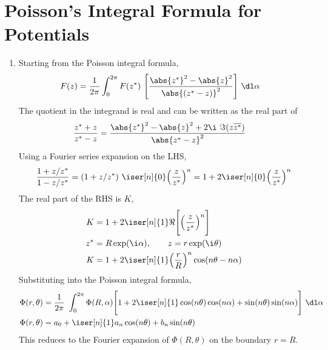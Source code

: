 \section{Poisson's Integral Formula for Potentials}

\begin{enumerate}
    \item Starting from the Poisson integral formula,
          \begin{align}
              F(z) & = \frac{1}{2\pi} \int_{0}^{2\pi} F(z^*)
              \ \Bigg[\frac{\abs{z^*}^2 - \abs{z}^2} {\abs{(z^* - z)}^2}\Bigg]
              \ \dl \alpha
          \end{align}
          The quotient in the integrand is real and can be written as the real part of
          \begin{align}
              \frac{z^* + z}{z^* - z} & = \frac{\abs{z^*}^2 - \abs{z}^2
                  + 2\i\ \Im(z \overline{z^*})}{\abs{z^* - z}^2}
          \end{align}
          Using a Fourier series expansion on the LHS,
          \begin{align}
              \frac{1 + z/z^*}{1 - z/z^*} = (1 + z/z^*)\ \iser[n]{0}
              \Big(\frac{z}{z^*}\Big)^n = 1 + 2\iser[n]{0} \Big(\frac{z}{z^*}
              \Big)^n
          \end{align}
          The real part of the RHS is $ K $,
          \begin{align}
              K   & = 1 + 2 \iser[n]{1} \Re{\Bigg[ \Big(\frac{z}{z^*} \Big)^n \Bigg]} \\
              z^* & = R\exp(\i \alpha), \qquad z = r\exp(\i \theta)                   \\
              K   & = 1 + 2 \iser[n]{1} \Big( \frac{r}{R} \Big)^n \cos(n\theta
              - n\alpha)
          \end{align}
          Substituting into the Poisson integral formula,
          \begin{align}
              \Phi(r, \theta) & = \frac{1}{2\pi}\ \int_{0}^{2\pi} \Phi(R, \alpha)
              \Bigg[ 1 + 2\iser[n]{1} \cos(n\theta)\cos(n\alpha)
              + \sin(n\theta)\sin(n\alpha) \Bigg]\ \dl \alpha                     \\
              \Phi(r, \theta) & = a_0 + \iser[n]{1} a_n\cos(n\theta)
              + b_n\sin(n\theta)
          \end{align}
          This reduces to the Fourier expansion of $ \Phi(R, \theta) $ on the
          boundary $ r = R $.


\end{enumerate}
